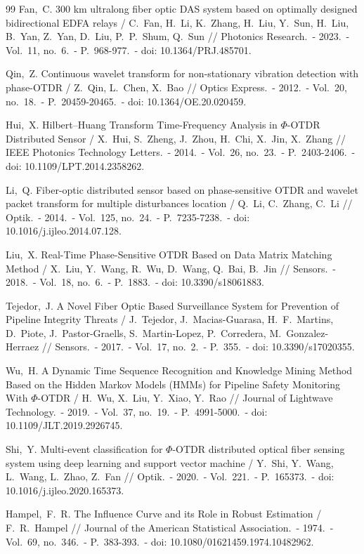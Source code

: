 \documentclass[12pt,a4paper]{extarticle}
\begin{document}
\begin{thebibliography}{99}
  Fan,~C. 300 km ultralong fiber optic DAS system based on optimally designed bidirectional EDFA relays / C.~Fan, H.~Li, K.~Zhang, H.~Liu, Y.~Sun, H.~Liu, B.~Yan, Z.~Yan, D.~Liu, P.~P.~Shum, Q.~Sun // Photonics Research.~- 2023.~- Vol.~11, no.~6.~- P.~968-977.~- doi: 10.1364/PRJ.485701.

  Qin,~Z. Continuous wavelet transform for non-stationary vibration detection with phase-OTDR / Z.~Qin, L.~Chen, X.~Bao // Optics Express.~- 2012.~- Vol.~20, no.~18.~- P.~20459-20465.~- doi: 10.1364/OE.20.020459.

  Hui,~X. Hilbert–Huang Transform Time-Frequency Analysis in $\Phi$-OTDR Distributed Sensor / X.~Hui, S.~Zheng, J.~Zhou, H.~Chi, X.~Jin, X.~Zhang // IEEE Photonics Technology Letters.~- 2014.~- Vol.~26, no.~23.~- P.~2403-2406.~- doi: 10.1109/LPT.2014.2358262.

  Li,~Q. Fiber-optic distributed sensor based on phase-sensitive OTDR and wavelet packet transform for multiple disturbances location / Q.~Li, C.~Zhang, C.~Li // Optik.~- 2014.~- Vol.~125, no.~24.~- P.~7235-7238.~- doi: 10.1016/j.ijleo.2014.07.128.

  Liu,~X. Real-Time Phase-Sensitive OTDR Based on Data Matrix Matching Method / X.~Liu, Y.~Wang, R.~Wu, D.~Wang, Q.~Bai, B.~Jin // Sensors.~- 2018.~- Vol.~18, no.~6.~- P.~1883.~- doi: 10.3390/s18061883.

  Tejedor,~J. A Novel Fiber Optic Based Surveillance System for Prevention of Pipeline Integrity Threats / J.~Tejedor, J.~Macias-Guarasa, H.~F.~Martins, D.~Piote, J.~Pastor-Graells, S.~Martin-Lopez, P.~Corredera, M.~Gonzalez-Herraez // Sensors.~- 2017.~- Vol.~17, no.~2.~- P.~355.~- doi: 10.3390/s17020355.

  Wu,~H. A Dynamic Time Sequence Recognition and Knowledge Mining Method Based on the Hidden Markov Models (HMMs) for Pipeline Safety Monitoring With $\Phi$-OTDR / H.~Wu, X.~Liu, Y.~Xiao, Y.~Rao // Journal of Lightwave Technology.~- 2019.~- Vol.~37, no.~19.~- P.~4991-5000.~- doi: 10.1109/JLT.2019.2926745.

  Shi,~Y. Multi-event classification for $\Phi$-OTDR distributed optical fiber sensing system using deep learning and support vector machine / Y.~Shi, Y.~Wang, L.~Wang, L.~Zhao, Z.~Fan // Optik.~- 2020.~- Vol.~221.~- P.~165373.~- doi: 10.1016/j.ijleo.2020.165373.

  Hampel,~F.~R. The Influence Curve and its Role in Robust Estimation / F.~R.~Hampel // Journal of the American Statistical Association.~- 1974.~- Vol.~69, no.~346.~- P.~383-393.~- doi: 10.1080/01621459.1974.10482962.

\end{thebibliography}
\end{document}
